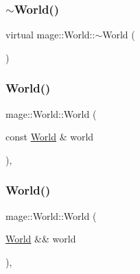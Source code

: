\hypertarget{classmage_1_1_world_aa51807f68564554dcc2e5f4527e0a620}{}\label{classmage_1_1_world_aa51807f68564554dcc2e5f4527e0a620} 
\subsubsection{\texorpdfstring{$\sim$\+World()}{~World()}}
{\footnotesize\ttfamily virtual mage\+::\+World\+::$\sim$\+World (\begin{DoxyParamCaption}{ }\end{DoxyParamCaption})\hspace{0.3cm}{\ttfamily [virtual]}}

\hypertarget{classmage_1_1_world_a28e20e33499cd57282cefa5ab0fda041}{}\label{classmage_1_1_world_a28e20e33499cd57282cefa5ab0fda041} 
\subsubsection{\texorpdfstring{World()}{World()}\hspace{0.1cm}{\footnotesize\ttfamily [2/3]}}
{\footnotesize\ttfamily mage\+::\+World\+::\+World (\begin{DoxyParamCaption}\item[{const \hyperlink{classmage_1_1_world}{World} \&}]{world }\end{DoxyParamCaption})\hspace{0.3cm}{\ttfamily [private]}, {\ttfamily [delete]}}

\hypertarget{classmage_1_1_world_a29c5740a1fc3bfd7f05c6692257d17ff}{}\label{classmage_1_1_world_a29c5740a1fc3bfd7f05c6692257d17ff} 
\subsubsection{\texorpdfstring{World()}{World()}\hspace{0.1cm}{\footnotesize\ttfamily [3/3]}}
{\footnotesize\ttfamily mage\+::\+World\+::\+World (\begin{DoxyParamCaption}\item[{\hyperlink{classmage_1_1_world}{World} \&\&}]{world }\end{DoxyParamCaption})\hspace{0.3cm}{\ttfamily [private]}, {\ttfamily [delete]}}



